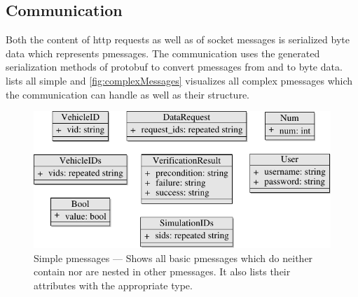 \subsection{Communication}\label{subsec:communication}
Both the content of \gls{http} requests as well as of socket messages is serialized byte data which represents \glspl{pmessage}.
The communication uses the generated serialization methods of \Gls{protobuf} to convert \glspl{pmessage} from and to byte data.
 lists all simple and \cref{fig:complexMessages} visualizes all complex \glspl{pmessage} which the communication can handle as well as their structure.
\begin{figure}
    \centering
    \includegraphics[width=\textwidth, height=.95\textheight, keepaspectratio]{diagrams/messagesTypeGraph-1.pdf}
    \medskip
    \caption{%
        Simple \glspl{pmessage} --- Shows all basic \glspl{pmessage} which do neither contain nor are nested in other \glspl{pmessage}.
        It also lists their attributes with the appropriate type.
    }\label{fig:simpleMessages}
\end{figure}
